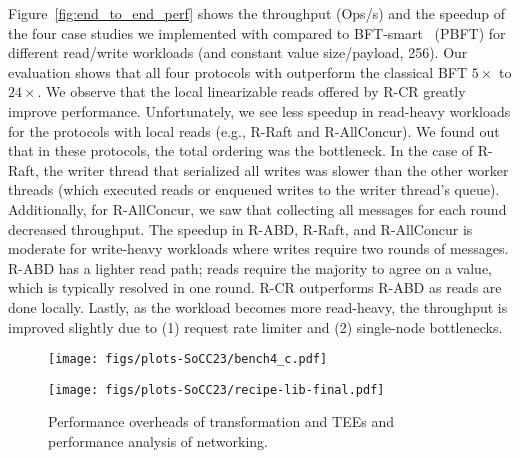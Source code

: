  Figure~\ref{fig:end_to_end_perf} shows the throughput (Ops/s) and the speedup of the four case studies we implemented with \projecttitle{} compared to BFT-smart~\cite{bft-smart} (PBFT) for different read/write workloads (and constant value size/payload, \SI{256}{\byte}). Our evaluation shows that all four protocols with \projecttitle{} outperform the classical BFT $5\times$ to $24\times$. We observe that the local linearizable reads offered by R-CR greatly improve performance. Unfortunately, we see less speedup in read-heavy workloads for the protocols with local reads (e.g., R-Raft and R-AllConcur). We found out that in these protocols, the total ordering was the bottleneck. In the case of R-Raft, the writer thread that serialized all writes was slower than the other worker threads (which executed reads or enqueued writes to the writer thread's queue). Additionally, for R-AllConcur, we saw that collecting all messages for each round decreased throughput. The speedup in R-ABD, R-Raft, and R-AllConcur is moderate for write-heavy workloads where writes require two rounds of messages. R-ABD has a lighter read path; reads require the majority to agree on a value, which is typically resolved in one round. R-CR outperforms R-ABD as reads are done locally. Lastly, as the workload becomes more read-heavy, the throughput is improved slightly due to (1) request rate limiter and (2) single-node bottlenecks.







\begin{figure*}[t]
    \begin{minipage}[t]{.45\textwidth}
        \centering
        \texttt{[image: figs/plots-SoCC23/bench4\_c.pdf]}
        \label{fig:overheads}
        \vspace{2pt}
    \end{minipage}
    \hfill
    \begin{minipage}[t]{.45\textwidth}
        \centering
        \texttt{[image: figs/plots-SoCC23/recipe-lib-final.pdf]}
        \label{fig:network}
        \vspace{2pt}
    \end{minipage}  
    \label{fig:1-2}
    \caption{Performance overheads of transformation and TEEs and performance analysis of \projecttitle{} networking.}
    \vspace{5pt}
\end{figure*}



